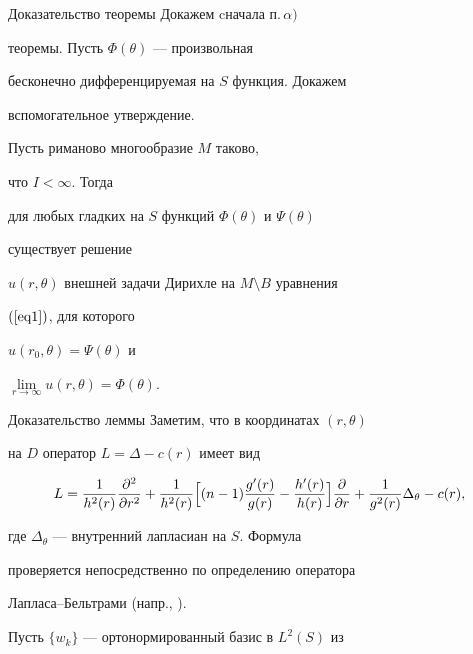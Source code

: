 \begin{pf*}{Доказательство теоремы} Докажем cначала п.\,$\alpha)$


теоремы. Пусть $\Phi(\theta)$ --- произвольная


бесконечно дифференцируемая на $S$ функция. Докажем


вспомогательное утверждение.





\begin{lemnonum} Пусть риманово многообразие $M$ таково,


что $I<\infty$. Тогда


для любых гладких на $S$ функций $\Phi(\theta)$ и $\Psi(\theta)$


существует решение


$u(r,\theta)$ внешней задачи Дирихле на $M\setminus B$ уравнения


$(\ref{eq1})$, для которого


$u(r_0,\theta)=\Psi(\theta)$ и


$\lim\limits_{ r\to\infty}u(r,\theta)=\Phi(\theta)$.


\end{lemnonum}





\begin{pf*}{Доказательство леммы} Заметим, что в координатах $(r,\theta)$


на $D$ оператор $L=\Delta-c(r)$ имеет вид


\begin{equation}


L=\frac1{h^2(r)}\frac{\partial^2}{\partial r^2}+\frac1{h^2(r)}\Bigl[(n-1)\frac


{g'(r)}{g(r)}-\frac{h'(r)}{h(r)}\Bigr]\frac{\partial}{\partial r}+\frac 1


{g^2(r)}\Delta_\theta-c(r),


\label{eq2}


\end{equation}


где $\Delta_\theta$ --- внутренний лапласиан на $S$. Формула


проверяется непосредственно по определению оператора


Лапласа--Бельтрами (напр., \cite{Los}).





Пусть $\{w_k\}$ --- ортонормированный базис в $L^2(S)$ из



\end{pf*}
\end{pf*}

